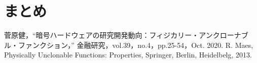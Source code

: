 \documentclass[survey]{ieicej}%
\begin{document}
\section{まとめ}


%
%
\begin{thebibliography}{99}%
  菅原健，“暗号ハードウェアの研究開発動向：フィジカリー・アンクローナブル・ファンクション，”
  金融研究，vol.39，no.4，pp.25-54，Oct. 2020.
  R. Maes, Physically Unclonable Functions: Properties, Springer, Berlin, Heidelbelg, 2013.

\end{thebibliography}


\end{document}

